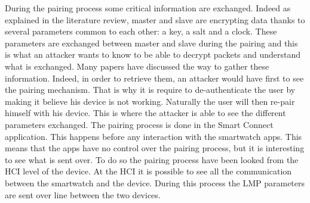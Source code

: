During the pairing process some critical information are exchanged. Indeed as explained in the literature review, master and slave are encrypting data thanks to several parameters common to each other: a key, a salt and a clock. These parameters are exchanged between master and slave during the pairing and this is what an attacker wants to know to be able to decrypt packets and understand what is exchanged.
Many papers have discussed the way to gather these information. Indeed, in order to retrieve them, an attacker would have first to see the pairing mechanism. That is why it is require to de-authenticate the user by making it believe his device is not working. Naturally the user will then re-pair himself with his device. This is where the attacker is able to see the different parameters exchanged. 
The pairing process is done in the Smart Connect application. This happens before any interaction with the smartwatch apps. This means that the apps have no control over the pairing process, but it is interesting to see what is sent over. 
To do so the pairing process have been looked from the HCI level of the device. At the HCI it is possible to see all the communication between the smartwatch and the device. During this process the LMP parameters are sent over line between the two devices. 
